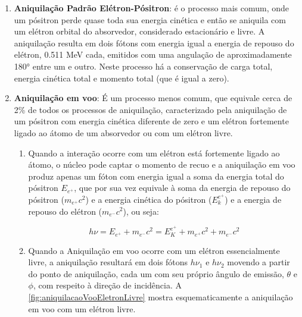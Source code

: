 \documentclass[11pt,a4paper]{article}
\begin{document}
            \begin{enumerate}
                \item \textbf{\textcolor{CarnationPink}{Aniquilação Padrão Elétron-Pósitron}}: é o processo mais comum, onde um pósitron perde quase toda sua energia cinética e então se aniquila com um elétron orbital do absorvedor, considerado estacionário e livre. A aniquilação resulta em dois fótons com energia igual a energia de repouso do elétron,  0.511 MeV cada, emitidos com uma angulação de aproximadamente \ang{180} entre um e outro. Neste processo há a conservação de carga total, energia cinética total e momento total (que é igual a zero).
                
                \item \textbf{\textcolor{CarnationPink}{Aniquilação em voo}}: É um processo menos comum, que equivale  cerca de 2\% de todos os processos de aniquilação, caracterizado pela aniquilação de um pósitron com energia cinética diferente de zero e um elétron fortemente ligado ao átomo de um absorvedor ou com um elétron livre.


                    \begin{enumerate}
                        \item Quando a interação ocorre com um elétron está fortemente ligado ao átomo, o núcleo pode captar o momento de recuo e a aniquilação em voo produz apenas um fóton com energia igual a soma da energia total do pósitron $E_{e^+}$, que por sua vez equivale à soma da energia de repouso do pósitron ($m_{e^+}c^2$) e a energia cinética do pósitron ($E_k^{e^+}$) e a energia de repouso do elétron ($m_{e^-}c^2$), ou seja:
                
                            \begin{equation}
                                h\nu = E_{e^+} + m_{e^-}c^2
                                = E_K^{e^+} + m_{e^+}c^2 + m_{e^-}c^2
                            \end{equation}

                        \item Quando a Aniquilação em voo ocorre com um elétron essencialmente livre, a aniquilação resultará em dois fótons $h\nu_1$ e $h\nu_2$ movendo a partir do ponto de aniquilação, cada um com seu próprio ângulo de emissão, $\theta$ e $\phi$, com respeito à direção de incidência. A \ref{fig:aniquilacaoVooEletronLivre} mostra esquematicamente a aniquilação em voo com um elétron livre.
                        

\end{enumerate}
\end{enumerate}
\end{document}
